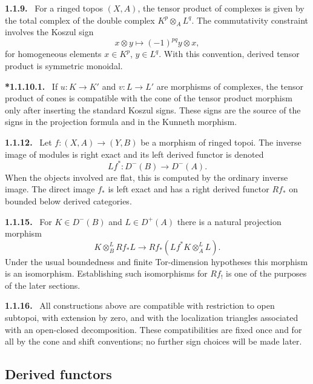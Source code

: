 \documentclass[12pt]{article}
\newenvironment{statement}[1]{\par\medskip\noindent\textbf{#1.}\ }{\par\medskip}
\begin{document}
\begin{statement}{1.1.9}
For a ringed topos \((X,A)\), the tensor product of complexes is given by the total complex of the double complex \(K^p\otimes_A L^q\). The commutativity constraint involves the Koszul sign
\[
x\otimes y\longmapsto (-1)^{pq}y\otimes x,
\]
for homogeneous elements \(x\in K^p\), \(y\in L^q\). With this convention, derived tensor product is symmetric monoidal.
\end{statement}

\begin{statement}{*1.1.10.1}
If \(u:K\to K'\) and \(v:L\to L'\) are morphisms of complexes, the tensor product of cones is compatible with the cone of the tensor product morphism only after inserting the standard Koszul signs. These signs are the source of the signs in the projection formula and in the Kunneth morphism.
\end{statement}

\begin{statement}{1.1.12}
Let \(f:(X,A)\to(Y,B)\) be a morphism of ringed topoi. The inverse image of modules is right exact and its left derived functor is denoted
\[
Lf^*:D^-(B)\to D^-(A).
\]
When the objects involved are flat, this is computed by the ordinary inverse image. The direct image \(f_*\) is left exact and has a right derived functor \(Rf_*\) on bounded below derived categories.
\end{statement}

\begin{statement}{1.1.15}
For \(K\in D^-(B)\) and \(L\in D^+(A)\) there is a natural projection morphism
\[
K\otimes_B^L Rf_*L\longrightarrow Rf_*(Lf^*K\otimes_A^L L).
\]
Under the usual boundedness and finite Tor-dimension hypotheses this morphism is an isomorphism. Establishing such isomorphisms for \(Rf_!\) is one of the purposes of the later sections.
\end{statement}

\begin{statement}{1.1.16}
All constructions above are compatible with restriction to open subtopoi, with extension by zero, and with the localization triangles associated with an open-closed decomposition. These compatibilities are fixed once and for all by the cone and shift conventions; no further sign choices will be made later.
\end{statement}


\subsection{Derived functors}
\end{document}
